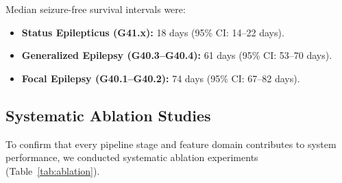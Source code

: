 \documentclass[11pt,a4paper]{article}
\begin{document}
Median seizure-free survival intervals were:
\begin{itemize}[leftmargin=*, itemsep=0.2em]
    \item \textbf{Status Epilepticus (G41.x):} 18 days (95\% CI: 14--22 days).
    \item \textbf{Generalized Epilepsy (G40.3--G40.4):} 61 days (95\% CI: 53--70 days).
    \item \textbf{Focal Epilepsy (G40.1--G40.2):} 74 days (95\% CI: 67--82 days).
\end{itemize}

\begin{table}[h!]
\centering
\caption{\textbf{Kaplan-Meier Number-at-Risk Table across Post-Discharge Follow-up Windows.}}
\label{tab:number_at_risk}
\end{table}

\subsection{Systematic Ablation Studies}
To confirm that every pipeline stage and feature domain contributes to system performance, we conducted systematic ablation experiments (Table~\ref{tab:ablation}).
\end{document}
